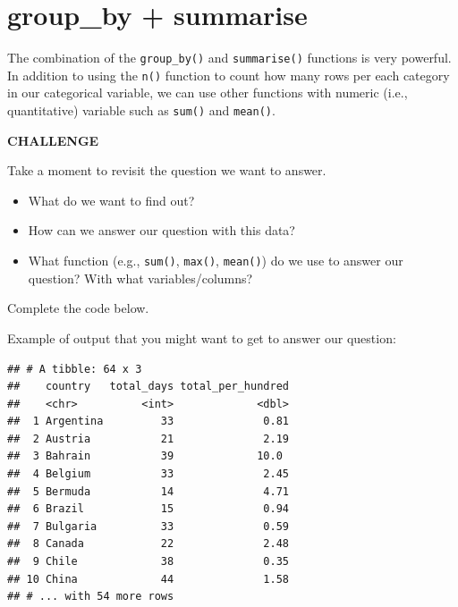 \documentclass[
]{book}
\newenvironment{Shaded}{\begin{snugshade}}{\end{snugshade}}
\newcommand{\DataTypeTok}[1]{\textcolor[rgb]{0.13,0.29,0.53}{#1}}
\newcommand{\KeywordTok}[1]{\textcolor[rgb]{0.13,0.29,0.53}{\textbf{#1}}}
\newcommand{\NormalTok}[1]{#1}
\newcommand{\OperatorTok}[1]{\textcolor[rgb]{0.81,0.36,0.00}{\textbf{#1}}}
\newcommand{\OtherTok}[1]{\textcolor[rgb]{0.56,0.35,0.01}{#1}}
\newcommand{\StringTok}[1]{\textcolor[rgb]{0.31,0.60,0.02}{#1}}
\begin{document}
\hypertarget{group_by-summarise}{%
\section{group\_by + summarise}\label{group_by-summarise}}

The combination of the \texttt{group\_by()} and \texttt{summarise()} functions is very powerful. In addition to using the \texttt{n()} function to count how many rows per each category in our categorical variable, we can use other functions with numeric (i.e., quantitative) variable such as \texttt{sum()} and \texttt{mean()}.

\textbf{CHALLENGE}

Take a moment to revisit the question we want to answer.

\begin{itemize}
\item
  What do we want to find out?
\item
  How can we answer our question with this data?
\item
  What function (e.g., \texttt{sum()}, \texttt{max()}, \texttt{mean()}) do we use to answer our question? With what variables/columns?
\end{itemize}

Complete the code below.

\begin{Shaded}
\end{Shaded}

Example of output that you might want to get to answer our question:

\begin{verbatim}
## # A tibble: 64 x 3
##    country   total_days total_per_hundred
##    <chr>          <int>             <dbl>
##  1 Argentina         33              0.81
##  2 Austria           21              2.19
##  3 Bahrain           39             10.0 
##  4 Belgium           33              2.45
##  5 Bermuda           14              4.71
##  6 Brazil            15              0.94
##  7 Bulgaria          33              0.59
##  8 Canada            22              2.48
##  9 Chile             38              0.35
## 10 China             44              1.58
## # ... with 54 more rows
\end{verbatim}
\end{document}
